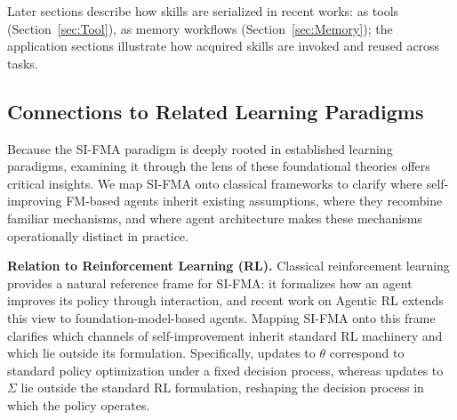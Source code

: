 Later sections describe how skills are serialized in recent works: as tools (Section~\ref{sec:Tool}), as memory workflows (Section~\ref{sec:Memory}); the application sections illustrate how acquired skills are invoked and reused across tasks.


\subsection{Connections to Related Learning Paradigms}
\label{subsec:Connections_to_Related_Learning_Paradigms}



Because the SI-FMA paradigm is deeply rooted in established learning paradigms, examining it through the lens of these foundational theories offers critical insights. We map SI-FMA onto classical frameworks to clarify where self-improving FM-based agents inherit existing assumptions, where they recombine familiar mechanisms, and where agent architecture makes these mechanisms operationally distinct in practice.

\textbf{Relation to Reinforcement Learning (RL).} 
Classical reinforcement learning provides a natural reference frame for SI-FMA: it formalizes how an agent improves its policy through interaction, and recent work on Agentic RL \citep{zhang2025landscape} extends this view to foundation-model-based agents. Mapping SI-FMA onto this frame clarifies which channels of self-improvement inherit standard RL machinery and which lie outside its formulation. Specifically, updates to $\theta$ correspond to standard policy optimization under a fixed decision process, whereas updates to $\Sigma$ lie outside the standard RL formulation, reshaping the decision process in which the policy operates.

